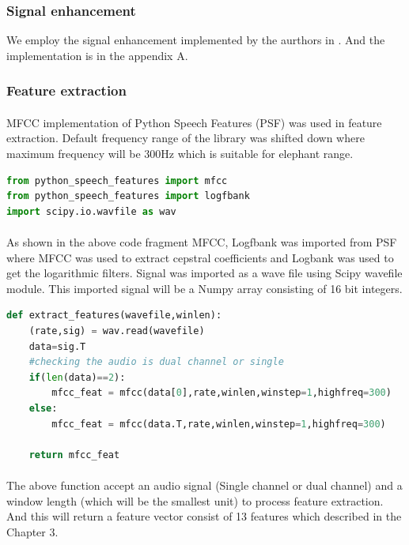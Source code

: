\documentclass[12pt]{article}
\numberwithin{figure}{section}
\numberwithin{table}{section}
\begin{document}
\subsubsection{Signal enhancement}
We employ the signal enhancement implemented by the aurthors in \cite{11}. And the implementation is in the appendix A.
 
\subsubsection{Feature extraction}
\paragraph{}
MFCC implementation of Python Speech Features (PSF) was used in feature extraction. Default frequency range of the library was shifted down where maximum frequency will be 300Hz which is suitable for elephant range.

\begin{lstlisting}[language=Python]
from python_speech_features import mfcc
from python_speech_features import logfbank
import scipy.io.wavfile as wav
\end{lstlisting}

\paragraph{}
As shown in the above code fragment MFCC, Logfbank was imported from PSF where MFCC was used to extract cepstral coefficients and Logbank was used to get the logarithmic filters. Signal was imported as a wave file using Scipy wavefile module. This imported signal will be a Numpy array consisting of 16 bit integers.

\begin{lstlisting}[language=Python]
def extract_features(wavefile,winlen):
    (rate,sig) = wav.read(wavefile)
    data=sig.T
    #checking the audio is dual channel or single
    if(len(data)==2):
        mfcc_feat = mfcc(data[0],rate,winlen,winstep=1,highfreq=300)
    else:
        mfcc_feat = mfcc(data.T,rate,winlen,winstep=1,highfreq=300)
        
    return mfcc_feat
\end{lstlisting}

\paragraph{}
The above function accept an audio signal (Single channel or dual channel) and a window length (which will be the smallest unit) to process feature extraction. And this will return a feature vector consist of 13 features which described in the Chapter 3. 
\end{document}
